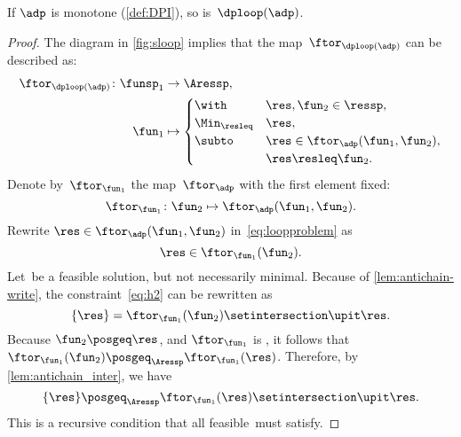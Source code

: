 \begin{proposition}
    \label{prop:loop-continuous}
    If $\adp$ is monotone (\cref{def:DPI}),
    so is~$\dploop(\adp)$.
\end{proposition}
\begin{proof}
    The diagram in \cref{fig:sloop} implies that the map~$\ftor_{\dploop(\adp)}$
    can be described as:
    \begin{align}
        \ftor_{\dploop(\adp)}\colon\funsp_{1} & \to\Aressp,\label{eq:loopproblem}                                                   \\
        \fun_{1}                              & \mapsto\begin{cases}
                                                           \with          & \res,\fun_{2}\in\ressp,                 \\
                                                           \Min_{\resleq} & \res,                                   \\
                                                           \subto         & \res\in\ftor_{\adp}(\fun_{1},\fun_{2}), \\
                                                                          & \res\resleq\fun_{2}.
                                                       \end{cases}
    \end{align}
    Denote by~$\ftor_{\fun_{1}}$ the map~$\ftor_{\adp}$ with the first element fixed:
    \begin{equation*}
        \ftor_{\fun_{1}}\colon\fun_{2}\mapsto\ftor_{\adp}(\fun_{1},\fun_{2}).
    \end{equation*}
    Rewrite $\res\in\ftor_{\adp}(\fun_{1},\fun_{2})$ in~\cref{eq:loopproblem} as
    \begin{equation}
        \res\in\ftor_{\fun_{1}}(\fun_{2}).
        \label{eq:h2}
    \end{equation}
    Let~\res be a feasible solution, but not necessarily minimal.
    Because of \cref{lem:antichain-write}, the constraint~\cref{eq:h2} can be rewritten as
    \begin{equation}
        \{\res\}=\ftor_{\fun_{1}}(\fun_{2})\setintersection\upit\res.
        \label{eq:h3}
    \end{equation}
    Because $\fun_{2}\posgeq\res$, and $\ftor_{\fun_{1}}$ is \scottcontinuous, it follows that~$\ftor_{\fun_{1}}(\fun_{2})\posgeq_{\Aressp}\ftor_{\fun_{1}}(\res)$.
    Therefore, by \cref{lem:antichain_inter}, we have
    \begin{equation}
        \{\res\}\posgeq_{\Aressp}\ftor_{\fun_{1}}(\res)\setintersection\upit\res.
        \label{eq:fea}
    \end{equation}
    This is a recursive condition that all feasible~\res must satisfy.


\end{proof}
